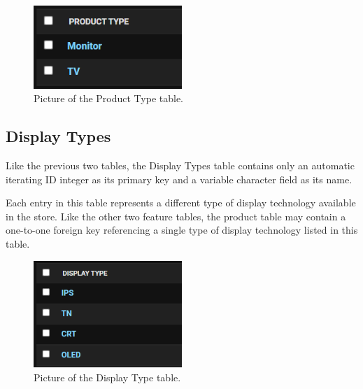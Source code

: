 \documentclass[sigconf]{acmart}
\begin{document}
\begin{figure}[H] %
	\centering %
	\includegraphics[width=0.5\textwidth]{Figures/producttype.png} %
	\caption{Picture of the Product Type table.}
\end{figure}

\subsection{Display Types}
Like the previous two tables, the Display Types table contains only an automatic iterating ID integer as its primary key and a variable character field as its name. \par
Each entry in this table represents a different type of display technology available in the store. Like the other two feature tables, the product table may contain a one-to-one foreign key referencing a single type of display technology listed in this table.

\begin{figure}[H] %
	\centering %
	\includegraphics[width=0.5\textwidth]{Figures/displaytypes.png} %
	\caption{Picture of the Display Type table.}
\end{figure}
\end{document}
